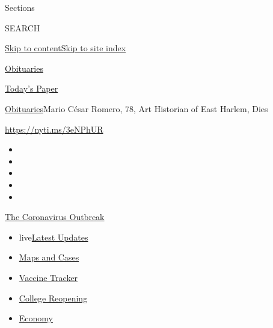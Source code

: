 Sections

SEARCH

\protect\hyperlink{site-content}{Skip to
content}\protect\hyperlink{site-index}{Skip to site index}

\href{https://www.nytimes.com/section/obituaries}{Obituaries}

\href{https://myaccount.nytimes.com/auth/login?response_type=cookie\&client_id=vi}{}

\href{https://www.nytimes.com/section/todayspaper}{Today's Paper}

\href{/section/obituaries}{Obituaries}\textbar{}Mario César Romero, 78,
Art Historian of East Harlem, Dies

\url{https://nyti.ms/3eNPhUR}

\begin{itemize}
\item
\item
\item
\item
\item
\end{itemize}

\href{https://www.nytimes.com/news-event/coronavirus?action=click\&pgtype=Article\&state=default\&region=TOP_BANNER\&context=storylines_menu}{The
Coronavirus Outbreak}

\begin{itemize}
\tightlist
\item
  live\href{https://www.nytimes.com/2020/08/03/world/coronavirus-covid-19.html?action=click\&pgtype=Article\&state=default\&region=TOP_BANNER\&context=storylines_menu}{Latest
  Updates}
\item
  \href{https://www.nytimes.com/interactive/2020/us/coronavirus-us-cases.html?action=click\&pgtype=Article\&state=default\&region=TOP_BANNER\&context=storylines_menu}{Maps
  and Cases}
\item
  \href{https://www.nytimes.com/interactive/2020/science/coronavirus-vaccine-tracker.html?action=click\&pgtype=Article\&state=default\&region=TOP_BANNER\&context=storylines_menu}{Vaccine
  Tracker}
\item
  \href{https://www.nytimes.com/2020/08/02/us/covid-college-reopening.html?action=click\&pgtype=Article\&state=default\&region=TOP_BANNER\&context=storylines_menu}{College
  Reopening}
\item
  \href{https://www.nytimes.com/live/2020/08/03/business/stock-market-today-coronavirus?action=click\&pgtype=Article\&state=default\&region=TOP_BANNER\&context=storylines_menu}{Economy}
\end{itemize}

